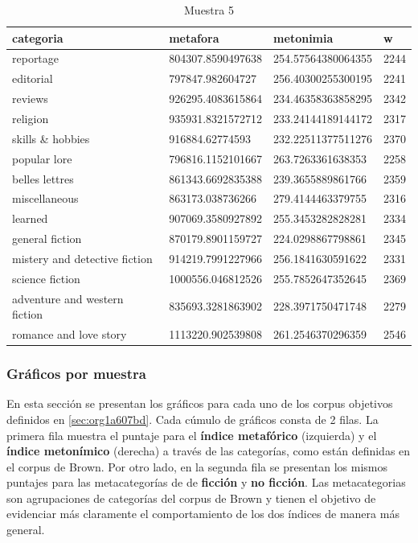 \documentclass[12pt,letterpaper,twoside]{article}
\begin{document}
\begin{center}
\begin{longtable}{| p{} | p{} | p{}|p{}|}
\caption{Muestra 5}
    \hline
        categoria & metafora & metonimia & w \\ \hline
        reportage & 804307.8590497638 & 254.57564380064355 & 2244 \\ \hline
        editorial & 797847.982604727 & 256.40300255300195 & 2241 \\ \hline
        reviews & 926295.4083615864 & 234.46358363858295 & 2342 \\ \hline
        religion & 935931.8321572712 & 233.24144189144172 & 2317 \\ \hline
        skills \& hobbies & 916884.62774593 & 232.22511377511276 & 2370 \\ \hline
        popular lore & 796816.1152101667 & 263.7263361638353 & 2258 \\ \hline
        belles lettres & 861343.6692835388 & 239.3655889861766 & 2359 \\ \hline
        miscellaneous & 863173.038736266 & 279.4144463379755 & 2316 \\ \hline
        learned & 907069.3580927892 & 255.3453282828281 & 2334 \\ \hline
        general fiction & 870179.8901159727 & 224.0298867798861 & 2345 \\ \hline
        mistery and detective fiction & 914219.7991227966 & 256.1841630591622 & 2331 \\ \hline
        science fiction & 1000556.046812526 & 255.7852647352645 & 2369 \\ \hline
        adventure and western fiction & 835693.3281863902 & 228.3971750471748 & 2279 \\ \hline
        romance and love story & 1113220.902539808 & 261.2546370296359 & 2546 \\ \hline
\end{longtable}
    \label{muestra5}
\end{center}
\subsubsection{Gráficos por muestra}
\label{sec:orgc53859a}
En esta sección se presentan los gráficos para cada uno de los corpus objetivos
definidos en \ref{sec:org1a607bd}. Cada cúmulo de gráficos consta de 2 filas.
La primera fila muestra el puntaje para el \textbf{índice metafórico} (izquierda) y
el \textbf{índice metonímico} (derecha) a través de las categorías, como están
definidas en el corpus de Brown. Por otro lado, en la segunda fila
se presentan los mismos puntajes para las metacategorías de de \textbf{ficción}
y \textbf{no ficción}. Las metacategorias son agrupaciones de categorías del corpus
de Brown y tienen el objetivo de evidenciar más claramente el comportamiento
de los dos índices de manera más general.
\end{document}
